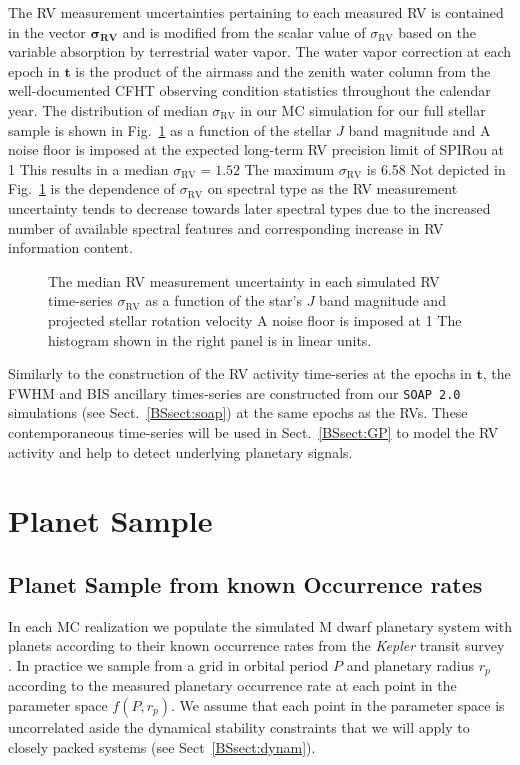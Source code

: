 \noindent The RV measurement uncertainties pertaining to each measured RV is contained in the vector
$\boldsymbol{\sigma_{\text{RV}}}$ and is modified from the scalar value of $\sigma_{\text{RV}}$
based on the variable absorption by terrestrial
water vapor. The water vapor correction at each epoch in $\mathbf{t}$ is the product of the airmass and the zenith
water column from the well-documented CFHT observing condition statistics throughout the calendar year. 
The distribution of median $\sigma_{\text{RV}}$ in our MC simulation for our full
stellar sample is shown in Fig.~\ref{BSfig:sigmaRV} as a function
of the stellar $J$ band magnitude and  A noise floor is imposed at the expected long-term RV precision limit
of SPIRou at 1  This results in a median
$\sigma_{\text{RV}}=1.52$  The maximum $\sigma_{\text{RV}}$ is 6.58  
Not depicted in Fig.~\ref{BSfig:sigmaRV} is the dependence of
$\sigma_{\text{RV}}$ on spectral type as the RV measurement uncertainty tends to decrease towards later spectral types
due to the increased number of available spectral features and corresponding increase in RV information content.

\begin{figure}
  \centering
  \caption{The median RV measurement uncertainty in each simulated RV time-series $\sigma_{\text{RV}}$
    as a function of the star's $J$ band magnitude and projected stellar rotation velocity  A noise floor is
    imposed at 1  The histogram shown in the right panel is in linear units.}
  \label{BSfig:sigmaRV}
\end{figure}

Similarly to the construction of the RV activity time-series at the epochs in $\mathbf{t}$, the FWHM and BIS
ancillary times-series are constructed from our \texttt{SOAP 2.0} simulations (see Sect.~\ref{BSsect:soap}) 
at the same epochs as the RVs. These contemporaneous time-series will be used in Sect.~\ref{BSsect:GP} to
model the RV activity and help to detect underlying planetary signals.


\section{Planet Sample} \label{BSsect:planetsample}
\subsection{Planet Sample from known Occurrence rates}
In each MC realization we populate the simulated M dwarf planetary system with planets according to
their known occurrence rates from the \emph{Kepler} transit survey \citep{dressing15a}. In practice
we sample from a grid in orbital period $P$ and planetary radius $r_p$
according to the measured planetary occurrence rate at each point in the parameter space $f(P,r_p)$.
We assume that each point in the parameter space is
uncorrelated aside the dynamical stability constraints that we will apply to closely packed systems 
(see Sect~\ref{BSsect:dynam}).

